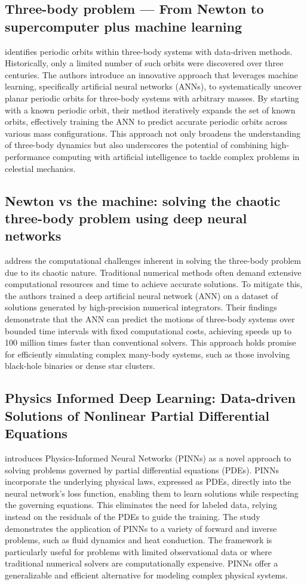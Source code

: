\documentclass[draft]{agujournal2019}
\begin{document}
\subsection{Three-body problem — From Newton to supercomputer plus machine learning}
\citep{Liao_2022} identifies periodic orbits within three-body systems with data-driven methods. Historically, only a limited number of such orbits were discovered over three centuries. The authors introduce an innovative approach that leverages machine learning, specifically artificial neural networks (ANNs), to systematically uncover planar periodic orbits for three-body systems with arbitrary masses. By starting with a known periodic orbit, their method iteratively expands the set of known orbits, effectively training the ANN to predict accurate periodic orbits across various mass configurations. This approach not only broadens the understanding of three-body dynamics but also underscores the potential of combining high-performance computing with artificial intelligence to tackle complex problems in celestial mechanics.
\subsection{Newton vs the machine: solving the chaotic three-body problem using deep neural networks}
\citep{Breen_2020} address the computational challenges inherent in solving the three-body problem due to its chaotic nature. Traditional numerical methods often demand extensive computational resources and time to achieve accurate solutions. To mitigate this, the authors trained a deep artificial neural network (ANN) on a dataset of solutions generated by high-precision numerical integrators. Their findings demonstrate that the ANN can predict the motions of three-body systems over bounded time intervals with fixed computational costs, achieving speeds up to 100 million times faster than conventional solvers. This approach holds promise for efficiently simulating complex many-body systems, such as those involving black-hole binaries or dense star clusters.
\subsection{Physics Informed Deep Learning: Data-driven Solutions of Nonlinear Partial Differential Equations}
\citep{raissi2017physicsinformeddeeplearning} introduces Physics-Informed Neural Networks (PINNs) as a novel approach to solving problems governed by partial differential equations (PDEs). PINNs incorporate the underlying physical laws, expressed as PDEs, directly into the neural network's loss function, enabling them to learn solutions while respecting the governing equations. This eliminates the need for labeled data, relying instead on the residuals of the PDEs to guide the training. The study demonstrates the application of PINNs to a variety of forward and inverse problems, such as fluid dynamics and heat conduction. The framework is particularly useful for problems with limited observational data or where traditional numerical solvers are computationally expensive. PINNs offer a generalizable and efficient alternative for modeling complex physical systems.
\end{document}
